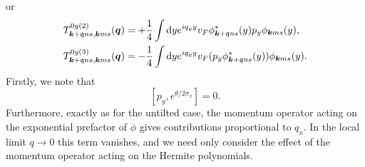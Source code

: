 or
\begin{align}
  T_{\bm{k} + \mathfrak{q} ns, \bm{k} ms}^{0y (2)} (\bm{q}) &=
                                                             + \frac{1}{4} \int \mathrm{d} y
                                                             e^{iq_{y} y} v_{F}
                                                             \phi ^{*}_{\bm{k}+\mathfrak{q} ns} (y) p_{y} \phi _{\bm{k} m s} (y),\\
  T_{\bm{k} + \mathfrak{q} ns, \bm{k} ms}^{0y (3)} (\bm{q}) &=
                                                             - \frac{1}{4} \int \mathrm{d} y
                                                             e^{iq_{y} y} v_{F}
                                                             (p_{y} \phi ^{*}_{\bm{k}+\mathfrak{q} ns} (y))  \phi _{\bm{k} m s} (y).
\end{align}
Firstly, we note that
\[
  [p_{y} , e^{\theta /2 \sigma _{x}}] = 0.
\]
Furthermore, exactly as for the untilted case, the momentum operator acting on the exponential prefactor of \(\phi \) gives contributions proportional to \(q_{x}\).
In the local limit \(q\to  0\) this term vanishes, and we need only consider the effect of the momentum operator acting on the Hermite polynomials.

